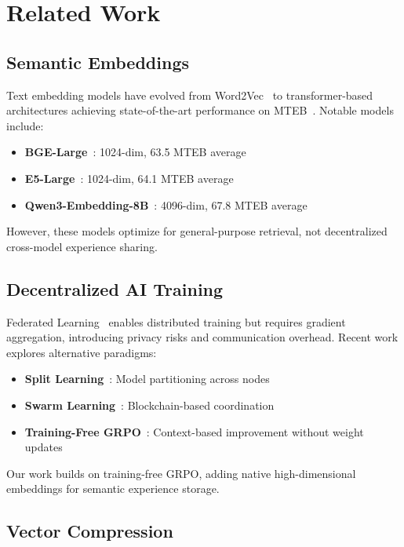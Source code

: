 \section{Related Work}


\subsection{Semantic Embeddings}

Text embedding models have evolved from Word2Vec~\cite{mikolov2013word2vec} to transformer-based architectures achieving state-of-the-art performance on MTEB~\cite{muennighoff2023mteb}. Notable models include:

\begin{itemize}
\item \textbf{BGE-Large}~\cite{xiao2024bge}: 1024-dim, 63.5 MTEB average
\item \textbf{E5-Large}~\cite{wang2024e5}: 1024-dim, 64.1 MTEB average
\item \textbf{Qwen3-Embedding-8B}~\cite{qwen2024embedding}: 4096-dim, 67.8 MTEB average
\end{itemize}

However, these models optimize for general-purpose retrieval, not decentralized cross-model experience sharing.

\subsection{Decentralized AI Training}

Federated Learning~\cite{mcmahan2017federated} enables distributed training but requires gradient aggregation, introducing privacy risks and communication overhead. Recent work explores alternative paradigms:

\begin{itemize}
\item \textbf{Split Learning}~\cite{gupta2018split}: Model partitioning across nodes
\item \textbf{Swarm Learning}~\cite{warnat2021swarm}: Blockchain-based coordination
\item \textbf{Training-Free GRPO}~\cite{tencent2025grpo}: Context-based improvement without weight updates
\end{itemize}

Our work builds on training-free GRPO, adding native high-dimensional embeddings for semantic experience storage.

\subsection{Vector Compression}

